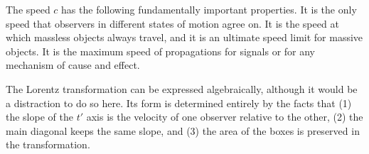 The speed $c$ has the following fundamentally important properties. It is the
only speed that observers in different states of motion agree on. It is the speed
at which massless objects always travel, and it is an ultimate speed limit for
massive objects. It is the maximum speed of propagations for signals or for
any mechanism of cause and effect.

The Lorentz transformation can be expressed algebraically, although it would
be a distraction to do so here. Its form is determined entirely by the facts
that (1) the slope of the $t'$ axis is the velocity of one observer relative to
the other, (2) the main diagonal keeps the same slope, and (3) the area of the boxes is preserved
in the transformation.
